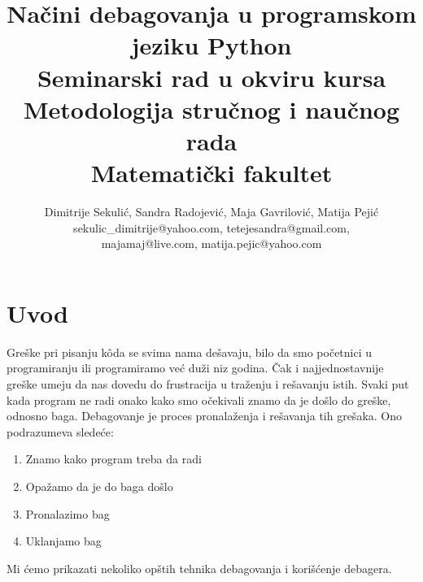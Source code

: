 \documentclass[a4paper]{article}
\begin{document}
\title{Načini debagovanja u programskom \\    jeziku Python\\ \small{Seminarski rad u okviru kursa\\Metodologija stručnog i naučnog rada\\ Matematički fakultet}}

\author{Dimitrije Sekulić, Sandra Radojević, Maja Gavrilović, Matija Pejić\\ sekulic\_dimitrije@yahoo.com, tetejesandra@gmail.com,\\ majamaj@live.com, matija.pejic@yahoo.com}


\maketitle


\setcounter{tocdepth}{1}
\tableofcontents

\newpage

\section{Uvod}
\label{sec:uvod}

Greške pri pisanju k\^{o}da se svima nama dešavaju, bilo da smo početnici u programiranju ili programiramo već duži niz godina. Čak i najjednostavnije greške umeju da nas dovedu do frustracija u traženju i rešavanju istih.
Svaki put kada program ne radi onako kako smo očekivali znamo da je došlo do greške, odnosno baga. Debagovanje je proces pronalaženja i rešavanja tih grešaka. Ono podrazumeva sledeće:
\begin{enumerate}
\item Znamo kako program treba da radi
\item Opažamo da je do baga došlo
\item Pronalazimo bag
\item Uklanjamo bag
\end{enumerate}
Mi ćemo prikazati nekoliko opštih tehnika debagovanja i korišćenje debagera.
\end{document}
